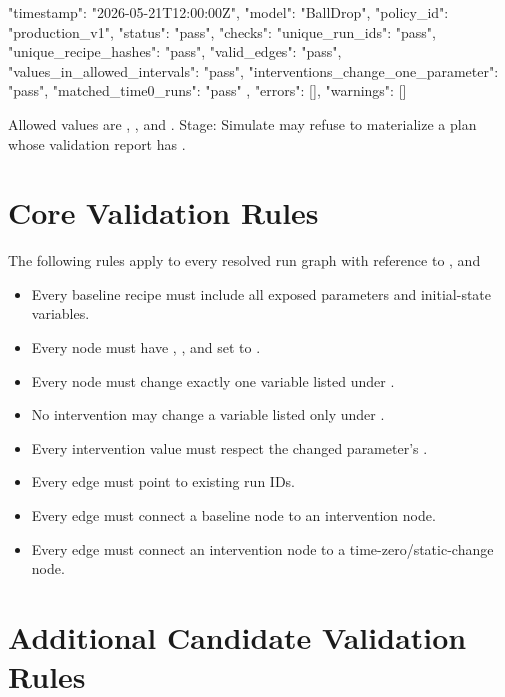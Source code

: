 \documentclass[11pt]{article}
\begin{document}
\begin{DocCode}
{
  "timestamp": "2026-05-21T12:00:00Z",
  "model": "BallDrop",
  "policy_id": "production_v1",
  "status": "pass",
  "checks": {
    "unique_run_ids": "pass",
    "unique_recipe_hashes": "pass",
    "valid_edges": "pass",
    "values_in_allowed_intervals": "pass",
    "interventions_change_one_parameter": "pass",
    "matched_time0_runs": "pass"
  },
  "errors": [],
  "warnings": []
}
\end{DocCode}

Allowed  values are , , and .
Stage: Simulate may refuse to materialize a plan whose validation report has .

\section*{Core Validation Rules}

The following rules apply to every resolved run graph with reference to ,  and 

\begin{itemize}
\item Every baseline recipe must include all exposed parameters and initial-state variables.
\item Every  node must have , , and  set to .
\item Every  node must change exactly one variable listed under .
\item No intervention may change a variable listed only under .
\item Every intervention value must respect the changed parameter's .
\item Every edge must point to existing run IDs.
\item Every  edge must connect a baseline node to an intervention node.
\item Every  edge must connect an intervention node to a time-zero/static-change node.
\end{itemize}

\section*{Additional Candidate Validation Rules}
\end{document}
